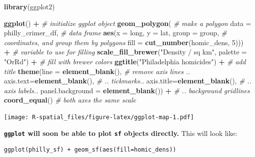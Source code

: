 \documentclass[]{book}
\newenvironment{Shaded}{\begin{snugshade}}{\end{snugshade}}
\newcommand{\KeywordTok}[1]{\textcolor[rgb]{0.13,0.29,0.53}{\textbf{#1}}}
\newcommand{\DataTypeTok}[1]{\textcolor[rgb]{0.13,0.29,0.53}{#1}}
\newcommand{\DecValTok}[1]{\textcolor[rgb]{0.00,0.00,0.81}{#1}}
\newcommand{\StringTok}[1]{\textcolor[rgb]{0.31,0.60,0.02}{#1}}
\newcommand{\CommentTok}[1]{\textcolor[rgb]{0.56,0.35,0.01}{\textit{#1}}}
\newcommand{\OperatorTok}[1]{\textcolor[rgb]{0.81,0.36,0.00}{\textbf{#1}}}
\newcommand{\NormalTok}[1]{#1}
\theoremstyle{definition}
\theoremstyle{definition}
\theoremstyle{definition}
\theoremstyle{remark}
\begin{document}
\begin{Shaded}
\begin{Highlighting}[]
\KeywordTok{library}\NormalTok{(ggplot2)}

\KeywordTok{ggplot}\NormalTok{() }\OperatorTok{+}\StringTok{                                               }\CommentTok{# initialize ggplot object}
\StringTok{  }\KeywordTok{geom_polygon}\NormalTok{(                                          }\CommentTok{# make a polygon}
    \DataTypeTok{data =}\NormalTok{ philly_crimer_df,                             }\CommentTok{# data frame}
    \KeywordTok{aes}\NormalTok{(}\DataTypeTok{x =}\NormalTok{ long, }\DataTypeTok{y =}\NormalTok{ lat, }\DataTypeTok{group =}\NormalTok{ group,                }\CommentTok{# coordinates, and group them by polygons}
        \DataTypeTok{fill =} \KeywordTok{cut_number}\NormalTok{(homic_dens, }\DecValTok{5}\NormalTok{))) }\OperatorTok{+}\StringTok{                }\CommentTok{# variable to use for filling}
\StringTok{  }\KeywordTok{scale_fill_brewer}\NormalTok{(}\StringTok{"Density / sq km"}\NormalTok{, }\DataTypeTok{palette =} \StringTok{"OrRd"}\NormalTok{) }\OperatorTok{+}\StringTok{ }\CommentTok{# fill with brewer colors }
\StringTok{  }\KeywordTok{ggtitle}\NormalTok{(}\StringTok{"Philadelphia homicides"}\NormalTok{) }\OperatorTok{+}\StringTok{    }\CommentTok{# add title}
\StringTok{  }\KeywordTok{theme}\NormalTok{(}\DataTypeTok{line =} \KeywordTok{element_blank}\NormalTok{(),                          }\CommentTok{# remove axis lines .. }
        \DataTypeTok{axis.text=}\KeywordTok{element_blank}\NormalTok{(),                       }\CommentTok{# .. tickmarks..}
        \DataTypeTok{axis.title=}\KeywordTok{element_blank}\NormalTok{(),                      }\CommentTok{# .. axis labels..}
        \DataTypeTok{panel.background =} \KeywordTok{element_blank}\NormalTok{()) }\OperatorTok{+}\StringTok{            }\CommentTok{# .. background gridlines}
\StringTok{  }\KeywordTok{coord_equal}\NormalTok{()                                          }\CommentTok{# both axes the same scale}
\end{Highlighting}
\end{Shaded}

\texttt{[image: R-spatial\_files/figure-latex/ggplot-map-1.pdf]}

\textbf{\texttt{ggplot} will soon be able to plot \texttt{sf} objects
directly.} This will look like:

\begin{verbatim}
ggplot(philly_sf) + geom_sf(aes(fill=homic_dens))
\end{verbatim}
\end{document}
